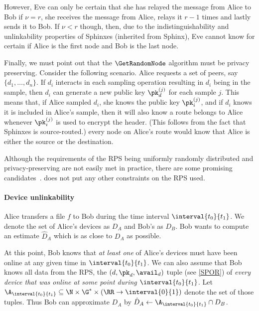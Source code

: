 However, Eve can only be certain that she has relayed the message from Alice to 
Bob if \(\nu = r\), \ie she receives the message from Alice, relays it \(r-1\) 
times and lastly sends it to Bob.
If \(\nu < r\) though, then, due to the indistinguishability and unlinkability 
properties of Sphinxes (inherited from \ac{Sphinx}), Eve cannot know for certain if 
Alice is the first node and Bob is the last node. 


Finally, we must point out that the \(\GetRandomNode\) algorithm must be 
privacy preserving.
Consider the following scenario.
Alice requests a set of peers, say \(\{d_1, \dotsc, d_n\}\).
If \(d_i\) interacts in each sampling operation resulting in \(d_i\) being in 
the sample, then \(d_i\) can generate a new public key \(\pk_d^{(j)}\) for each 
sample \(j\).
This means that, if Alice sampled \(d_i\), she knows the public key 
\(\pk_i^{(j)}\), and if \(d_i\) knows it is included in Alice's sample, then it 
will also know a route belongs to Alice whenever \(\pk_i^{(j)}\) is used to 
encrypt the header.
(This follows from the fact that Sphinxes is source-routed.)
\Ie every node on Alice's route would know that Alice is either the source or 
the destination.

Although the requirements of the \ac{RPS} being uniformly randomly
distributed and privacy-preserving are not easily met in practice,
there are some promising candidates~\cite[\eg][]{Octopus,BrahmsRPS}.
\name does not put any other constraints on the \ac{RPS} used.

\paragraph*{Device unlinkability}

Alice transfers a file \(f\) to Bob during the time interval 
\(\interval{t_0}{t_1}\).
We denote the set of Alice's devices as \(D_A\) and Bob's as \(D_B\).
Bob wants to compute an estimate \(\hat D_A\) which is as close to \(D_A\) as 
possible.

At this point, Bob knows that \emph{at least one} of Alice's devices must have 
been online at any given time in \(\interval{t_0}{t_1}\).
We can also assume that Bob knows all data from the \ac{RPS}, \ie the \((d, 
  \pk_d, \avail_d)\) tuple (see \cref{SPOR}) of \emph{every device that was 
  online at some point during \(\interval{t_0}{t_1}\)}.
Let \(\A_{\interval{t_0}{t_1}}\subseteq \N\times \G^*\times (\RR\to 
  \interval{0}{1})\) denote the set of those tuples.
Thus Bob can approximate \(D_A\) by \(\hat D_A \gets 
  \A_{\interval{t_0}{t_1}}\cap D_B\).

